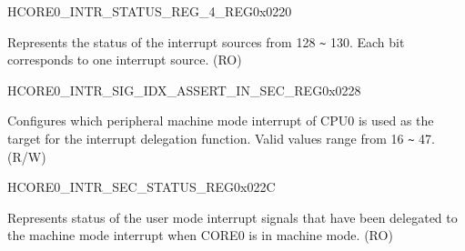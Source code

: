 \begin{register}{H}{CORE0\_INTR\_STATUS\_REG\_4\_REG}{0x0220}\label{regdesc:CORE0INTRSTATUSREG4REG}
%
\regnewline%
\begin{regdesc}\begin{reglist}
\label{fielddesc:CORE0INTRSTATUS4}\item [CORE0\_INTR\_STATUS\_4] Represents the status of the interrupt sources from 128 \verb+~+ 130. Each bit corresponds to one interrupt source. (RO)
\end{reglist}\end{regdesc}
\end{register}

\begin{register}{H}{CORE0\_INTR\_SIG\_IDX\_ASSERT\_IN\_SEC\_REG}{0x0228}\label{regdesc:CORE0INTRSIGIDXASSERTINSECREG}
%
%
\regnewline%
\begin{regdesc}\begin{reglist}
\label{fielddesc:CORE0INTRSIGIDXASSERTINSEC}\item [CORE0\_INTR\_SIG\_IDX\_ASSERT\_IN\_SEC] Configures which peripheral machine mode interrupt of CPU0 is used as the target for the interrupt delegation function. Valid values range from 16 \verb+~+ 47. (R/W)
\end{reglist}\end{regdesc}
\end{register}

\begin{register}{H}{CORE0\_INTR\_SEC\_STATUS\_REG}{0x022C}\label{regdesc:CORE0INTRSECSTATUSREG}
%
\regnewline%
\begin{regdesc}\begin{reglist}
\label{fielddesc:CORE0INTRSECSTATUS3}\item [CORE0\_INTR\_SEC\_STATUS] Represents status of the user mode interrupt signals that have been delegated to the machine mode interrupt when CORE0 is in machine mode. (RO)
\end{reglist}\end{regdesc}
\end{register}


